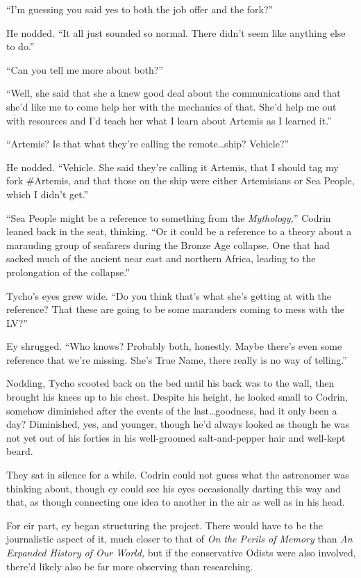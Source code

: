 ``I'm guessing you said yes to both the job offer and the fork?''

He nodded. ``It all just sounded so normal. There didn't seem like anything else to do.''

``Can you tell me more about both?''

``Well, she said that she a knew good deal about the communications and that she'd like me to come help her with the mechanics of that. She'd help me out with resources and I'd teach her what I learn about Artemis as I learned it.''

``Artemis? Is that what they're calling the remote\ldots ship? Vehicle?''

He nodded. ``Vehicle. She said they're calling it Artemis, that I should tag my fork \#Artemis, and that those on the ship were either Artemisians or Sea People, which I didn't get.''

``Sea People might be a reference to something from the \emph{Mythology,}'' Codrin leaned back in the seat, thinking. ``Or it could be a reference to a theory about a marauding group of seafarers during the Bronze Age collapse. One that had sacked much of the ancient near east and northern Africa, leading to the prolongation of the collapse.''

Tycho's eyes grew wide. ``Do you think that's what she's getting at with the reference? That these are going to be some marauders coming to mess with the LV?''

Ey shrugged. ``Who knows? Probably both, honestly. Maybe there's even some reference that we're missing. She's True Name, there really is no way of telling.''

Nodding, Tycho scooted back on the bed until his back was to the wall, then brought his knees up to his chest. Despite his height, he looked small to Codrin, somehow diminished after the events of the last\ldots goodness, had it only been a day? Diminished, yes, and younger, though he'd always looked as though he was not yet out of his forties in his well-groomed salt-and-pepper hair and well-kept beard.

They sat in silence for a while. Codrin could not guess what the astronomer was thinking about, though ey could see his eyes occasionally darting this way and that, as though connecting one idea to another in the air as well as in his head.

For eir part, ey began structuring the project. There would have to be the journalistic aspect of it, much closer to that of \emph{On the Perils of Memory} than \emph{An Expanded History of Our World,} but if the conservative Odists were also involved, there'd likely also be far more observing than researching.

